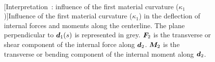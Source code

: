 \begin{figure}[p]
  \begin{leftfullpage}
    \captionsetup[subfloat]{captionskip=10pt}
     	\centering
     	 \\
	\vspace{30pt}
	\vspace{30pt}
	[Interpretation~: influence of the first material curvature ($\kappa_1$)]{Influence of the first material curvature ($\kappa_1$) in the deflection of internal forces and moments along the centerline. The plane perpendicular to $\boldsymbol{d}_1(s)$ is represented in grey. $\boldsymbol{F}_2$ is the transverse or shear component of the internal force along $\boldsymbol{d}_2$. $\boldsymbol{M}_2$ is the transverse or bending component of the internal moment along $\boldsymbol{d}_2$.}     
	\label{fig:d1}
 \end{leftfullpage}
\end{figure}
